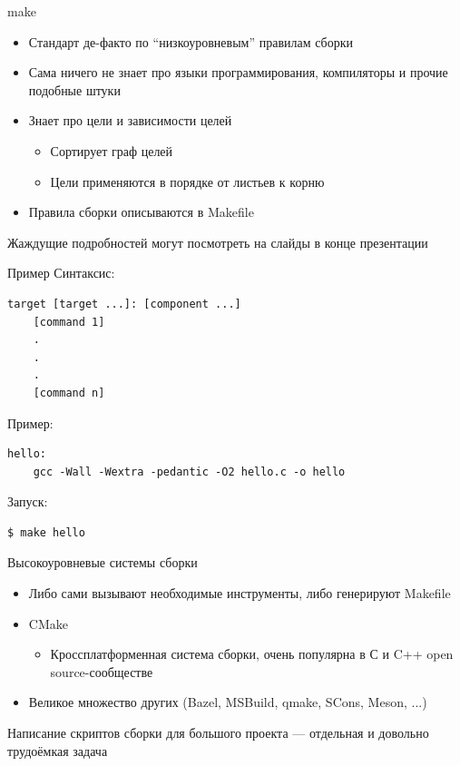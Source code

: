 \documentclass[aspectratio=169]{beamer}
\begin{document}
\begin{frame}{make}

    \begin{itemize}
        \item Стандарт де-факто по \enquote{низкоуровневым} правилам сборки
        \item Сама ничего не знает про языки программирования, компиляторы и прочие подобные штуки
        \item Знает про цели и зависимости целей
              \begin{itemize}
                  \item Сортирует граф целей
                  \item Цели применяются в порядке от листьев к корню
              \end{itemize}

        \item Правила сборки описываются в Makefile
    \end{itemize}

    {\scriptsize Жаждущие подробностей могут посмотреть на слайды в конце презентации}
\end{frame}

\begin{frame}[fragile]{Пример}
    Синтаксис:
    \begin{verbatim}
target [target ...]: [component ...]
    [command 1]
    .
    .
    .
    [command n]
    \end{verbatim}

    \vspace{1em}

    Пример:
    \begin{verbatim}
hello:
    gcc -Wall -Wextra -pedantic -O2 hello.c -o hello
    \end{verbatim}

    Запуск:
    \begin{verbatim}
$ make hello
    \end{verbatim}
\end{frame}


\begin{frame}{Высокоуровневые системы сборки}
    \begin{itemize}
        \item Либо сами вызывают необходимые инструменты, либо генерируют Makefile
        \item CMake
              \begin{itemize}
                  \item Кроссплатформенная система сборки, очень популярна в С и C++ open source-сообществе
              \end{itemize}
        \item Великое множество других (Bazel, MSBuild, qmake, SCons, Meson, ...)
    \end{itemize}
    Написание скриптов сборки для большого проекта --- отдельная и довольно трудоёмкая задача
\end{frame}
\end{document}
